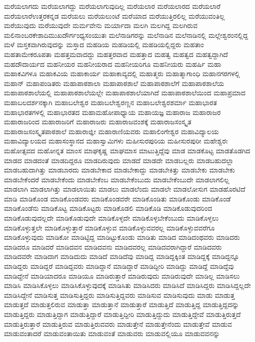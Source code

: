 {ಮರೆಯಲಾಗದು
ಮರೆಯಲಾಗದ್ದು
ಮರೆಯಲಾಗುವುದಿಲ್ಲ
ಮರೆಯಲಾರ
ಮರೆಯಲಾರದ
ಮರೆಯಲಾರೆ
ಮರೆಯಲಾರೆಉತ್ತರಕನ್ನಡ
ಮರೆಯಲು
ಮರೆಯಲುಂಟೆ
ಮರೆಯಾದ
ಮರೆಯುತ್ತಿರಲಿಲ್ಲ
ಮರೆಯುವಂತಿಲ್ಲ
ಮರೆಯುವುದು
ಮರೆಯುವುದೇ
ಮರ್ಮವೇನು
ಮರ್ಯಾದಾ
ಮಲಗಿ
ಮಲಗಿದ್ದ
ಮಲಗಿರುವ
ಮಲಿನಾಂಬರಕೇಶಾದಿಮುಖದೌರ್ಗಂಧ್ಯಸಂಯುತಃ
ಮಲೆನಾಡಿಗರನ್ನು
ಮಲೆನಾಡಿನ
ಮಲೆನಾಡಿನಲ್ಲಿ
ಮಲ್ಲೇಶ್ವರಂನಲ್ಲಿದ್ದ
ಮಳೆ
ಮಸ್ತಕವಾಗಿರುವುದನ್ನು
ಮಸ್ತಾದ
ಮಹಡಿಯ
ಮಹಡಿಯಲ್ಲಿ
ಮಹಡಿಯಲ್ಲಿದ್ದರು
ಮಹತಾಂ
ಮಹತಾಮೇಕರೂಪತಾ
ಮಹತ್ತಮವಾದದ್ದು
ಮಹತ್ತರವಾದ
ಮಹತ್ತಾದ
ಮಹತ್ವ
ಮಹತ್ವದ
ಮಹತ್ವದ್ದಾಗಿದೆ
ಮಹದೌದಾರ್ಯದ
ಮಹನೀಯರ
ಮಹನೀಯರಾದ
ಮಹನೀಯರಿಗೂ
ಮಹನೀಯರು
ಮಹರ್ಷಿ
ಮಹಾ
ಮಹಾಕವಿಗಳೂ
ಮಹಾಕವಿಯ
ಮಹಾಕಾರ್ಯ
ಮಹಾಕಾವ್ಯದಲ್ಲಿ
ಮಹಾತ್ಮರು
ಮಹಾತ್ಮಾಗಾಂಧಿ
ಮಹಾನಗರಗಳಲ್ಲಿ
ಮಹಾನ್
ಮಹಾಪಂಡಿತರು
ಮಹಾಪಾಠಶಾಲಾ
ಮಹಾಪಾಠಶಾಲೆ
ಮಹಾಪಾಠಶಾಲೆಗೆ
ಮಹಾಪಾಠಶಾಲೆಯ
ಮಹಾಪಾಠಶಾಲೆಯಲ್ಲಿ
ಮಹಾಪಾಠಶಾಲೆಯಲ್ಲೇ
ಮಹಾಪಾಠಶಾಲೆಯಾಗಿದೆ
ಮಹಾಪಾಠಶಾಲೆಯಿಂದ
ಮಹಾಪ್ರಮಾದ
ಮಹಾಬಲದರ್ಶನಕ್ಕಾಗಿ
ಮಹಾಬಲೇಶ್ವರ
ಮಹಾಬಲೇಶ್ವರಣ್ಣನ
ಮಹಾಬಲೇಶ್ವರಶರ್ಮಾ
ಮಹಾಭಾರತ
ಮಹಾಭಾರತಗಳಲ್ಲಿ
ಮಹಾಭಾರತದ
ಮಹಾಮಹೋಪಾಧ್ಯಾಯ
ಮಹಾಯಜ್ಞ
ಮಹಾರಾಜ
ಮಹಾರಾಜರ
ಮಹಾರಾಜರಿಂದ
ಮಹಾರಾಜರಿಗೆ
ಮಹಾರಾಜರು
ಮಹಾರಾಜವಂಶಕ್ಕೆ
ಮಹಾರಾಜಸಂಸ್ಕೃತ
ಮಹಾರಾಜಸಂಸ್ಕೃತಪಾಠಶಾಲೆ
ಮಹಾರಾಜ್ಞೀ
ಮಹಾರಾಣಿಯವರು
ಮಹಾಲಿಂಗೇಶ್ವರ
ಮಹಾವಿದ್ಯಾಲಯ
ಮಹಾವಿದ್ಯಾಲಯದ
ಮಹಾಸಂಸ್ಥಾನದ
ಮಹಾಸ್ವಾಮಿಗಳು
ಮಹೀಸುರಪುರಿಯ
ಮಹೀಸುರಪುರೀ
ಮಹೇಶ್ವರಃ
ಮಹೋತ್ಸವದ
ಮಹೋನ್ನತ
ಮಾಂಸ
ಮಾಘಕೃಷ್ಣ
ಮಾಘಮಾಸ
ಮಾಟುತ್ತಿದ್ದೆವು
ಮಾಡ
ಮಾಡಕೊಟ್ಟ
ಮಾಡತೊಡಗಿದ
ಮಾಡದ
ಮಾಡದಂತೆ
ಮಾಡದಿದ್ದರೂ
ಮಾಡದಿರುವುದು
ಮಾಡದೆ
ಮಾಡದೇ
ಮಾಡಬಲ್ಲರು
ಮಾಡಬಹುದಲ್ಲಾ
ಮಾಡಬಹುದಾಗಿತ್ತು
ಮಾಡಬಾರದು
ಮಾಡಬೇಕಾದ
ಮಾಡಬೇಕಾದ್ದು
ಮಾಡಬೇಕಿತ್ತು
ಮಾಡಬೇಕು
ಮಾಡಬೇಕು
ಮಾಡಬೇಕೆಂದರೆ
ಮಾಡಬೇಕೆಂದು
ಮಾಡಬೇಕೆಂಬ
ಮಾಡಬೇಕೆಂಬುದು
ಮಾಡಬೇಕೆಂಬುದೇ
ಮಾಡಲಾಗಲಿಲ್ಲ
ಮಾಡಲಾಗಿ
ಮಾಡಲಾಗಿತ್ತು
ಮಾಡಲಾಯಿತು
ಮಾಡಲು
ಮಾಡಲೆಂದು
ಮಾಡಲೇ
ಮಾಡಲೋಸುಗ
ಮಾಡಹೊರಟಿದೆ
ಮಾಡಿ
ಮಾಡಿಕೊಂಡ
ಮಾಡಿಕೊಂಡವರು
ಮಾಡಿಕೊಂಡವರೇ
ಮಾಡಿಕೊಂಡಿತು
ಮಾಡಿಕೊಂಡು
ಮಾಡಿಕೊಂಡೆ
ಮಾಡಿಕೊಂಡೆನು
ಮಾಡಿಕೊಟ್ಟ
ಮಾಡಿಕೊಟ್ಟರು
ಮಾಡಿಕೊಡಲಿ
ಮಾಡಿಕೊಡಿ
ಮಾಡಿಕೊಡುವುದರಿಂದ
ಮಾಡಿಕೊಡುವುದಲ್ಲದೇ
ಮಾಡಿಕೊಡುವುದೇ
ಮಾಡಿಕೊಳ್ಳದೇ
ಮಾಡಿಕೊಳ್ಳಬೇಕೆಂಬುದು
ಮಾಡಿಕೊಳ್ಳಲು
ಮಾಡಿಕೊಳ್ಳುತ್ತಲೇ
ಮಾಡಿಕೊಳ್ಳುತ್ತಾರೆ
ಮಾಡಿಕೊಳ್ಳುವ
ಮಾಡಿಕೊಳ್ಳುವವರಲ್ಲ
ಮಾಡಿಕೊಳ್ಳುವವರೆಗೂ
ಮಾಡಿಕೊಳ್ಳುವುದು
ಮಾಡಿಕೋ
ಮಾಡಿಟ್ಟಿದ್ದ
ಮಾಡಿಟ್ಟುಕೊಂಡು
ಮಾಡಿತು
ಮಾಡಿದ
ಮಾಡಿದಂಥವರು
ಮಾಡಿದರು
ಮಾಡಿದರೂ
ಮಾಡಿದರೆ
ಮಾಡಿದವನ
ಮಾಡಿದವನು
ಮಾಡಿದವರಲ್ಲ
ಮಾಡಿದವರಾಗಿದ್ದಾರೆ
ಮಾಡಿದವರು
ಮಾಡಿದವರೇ
ಮಾಡಿದಾಗ
ಮಾಡಿದುದು
ಮಾಡಿದೆ
ಮಾಡಿದೆವು
ಮಾಡಿದ್ದ
ಮಾಡಿದ್ದಕ್ಕಿಂತ
ಮಾಡಿದ್ದಕ್ಕೆ
ಮಾಡಿದ್ದನ್ನೂ
ಮಾಡಿದ್ದರು
ಮಾಡಿದ್ದರೆ
ಮಾಡಿದ್ದವರು
ಮಾಡಿದ್ದಾನೆ
ಮಾಡಿದ್ದಾರೆ
ಮಾಡಿದ್ದೀರಿ
ಮಾಡಿದ್ದು
ಮಾಡಿದ್ದೆ
ಮಾಡಿದ್ದೆವು
ಮಾಡಿದ್ದೇನೆ
ಮಾಡಿಯಾದರೂ
ಮಾಡಿಯೂ
ಮಾಡಿರುತ್ತಾರೆ
ಮಾಡಿರುವುದು
ಮಾಡಿರುವುದೇ
ಮಾಡಿಲ್ಲ
ಮಾಡಿಸಲು
ಮಾಡಿಸಿ
ಮಾಡಿಸಿಕೊಳ್ಳಲು
ಮಾಡಿಸಿಕೊಳ್ಳುವುದಕ್ಕೆ
ಮಾಡಿಸಿತು
ಮಾಡಿಸಿದರು
ಮಾಡಿಸಿದೆ
ಮಾಡಿಸಿದ್ದರು
ಮಾಡಿಸಿದ್ದಲ್ಲದೇ
ಮಾಡಿಸಿದ್ದೇನೆ
ಮಾಡಿಸುತ್ತ
ಮಾಡಿಸುತ್ತಿದ್ದರು
ಮಾಡಿಸುತ್ತಿದ್ದವರು
ಮಾಡಿಸುವ
ಮಾಡಿಸುವುದು
ಮಾಡು
ಮಾಡುತ್ತ
ಮಾಡುತ್ತದೆ
ಮಾಡುತ್ತಲಿರುವ
ಮಾಡುತ್ತಾ
ಮಾಡುತ್ತಾನೆ
ಮಾಡುತ್ತಾರೆ
ಮಾಡುತ್ತಿದೆ
ಮಾಡುತ್ತಿದ್ದ
ಮಾಡುತ್ತಿದ್ದದನ್ನು
ಮಾಡುತ್ತಿದ್ದರು
ಮಾಡುತ್ತಿದ್ದಾಗ
ಮಾಡುತ್ತಿದ್ದಾರೆ
ಮಾಡುತ್ತಿದ್ದೀರಿ
ಮಾಡುತ್ತಿದ್ದುದು
ಮಾಡುತ್ತಿದ್ದೇವೆ
ಮಾಡುತ್ತಿರುತ್ತದೆ
ಮಾಡುತ್ತಿರುತ್ತಾರೆ
ಮಾಡುತ್ತಿರುವ
ಮಾಡುತ್ತಿರುವವರು
ಮಾಡುತ್ತೇನೆ
ಮಾಡುತ್ತೇನೆಂದು
ಮಾಡುತ್ತೇವೆ
ಮಾಡುವ
ಮಾಡುವಂತಾದರೆ
ಮಾಡುವಂತಾಯಿತು
ಮಾಡುವಂತೆ
ಮಾಡುವರು
ಮಾಡುವಲ್ಲಿಯೂ
ಮಾಡುವವನನ್ನು
}
